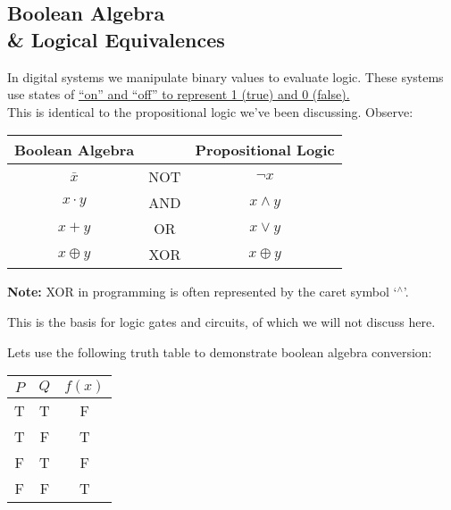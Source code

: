 
\subsection{Boolean Algebra\\ \& Logical Equivalences}
\vspace{1em}

In digital systems we manipulate binary values to evaluate logic. These systems use
states of \underline{``on'' and ``off'' to represent 1 (true) and 0 (false).}\\

\noindent
This is identical to the propositional logic we've been discussing. Observe:\\
\begin{center}
    \begin{tabular}{c c c}
        Boolean Algebra &     & Propositional Logic \\
        \hline
        $\bar{x}$       & NOT & $\neg x$            \\
        $x \cdot y$     & AND & $x \land y$         \\
        $x + y$         & OR  & $x \lor y$          \\
        $x \oplus y$    & XOR & $x \oplus y$        \\
        \hline
    \end{tabular}
\end{center}

\begin{Note}
    \textbf{Note:} XOR in programming is often represented by the caret symbol `$^\wedge $'.
\end{Note}

\noindent
This is the basis for logic gates and circuits, of which we will not discuss here.\\

\newpage

\noindent
Lets use the following truth table to demonstrate boolean algebra conversion:\\
\begin{center}
    \begin{tabular}{|c|c|c|}
        \hline
        \rowcolor{OliveGreen!10}
        $P$ & $Q$ & $f(x)$ \\
        \hline
        T   & T   & F      \\
        T   & F   & T      \\
        F   & T   & F      \\
        F   & F   & T      \\
        \hline
    \end{tabular}
\end{center}

